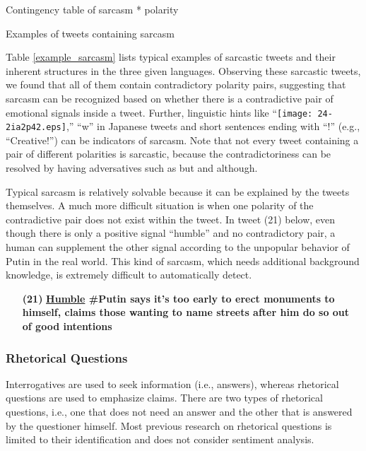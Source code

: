 \documentclass[english]{jnlp_1.4}
\begin{document}
\begin{table}[t]
\caption{Contingency table of sarcasm * polarity}
\label{contingency_sarcasm}

\end{table}
\begin{table}[t]
\caption{Examples of tweets containing sarcasm}
\label{example_sarcasm}

\end{table}

Table \ref{example_sarcasm} lists typical examples of sarcastic tweets and their inherent structures in the three given languages. Observing these sarcastic tweets, we found that all of them contain contradictory polarity pairs, suggesting that sarcasm can be recognized based on whether there is a contradictive pair of emotional signals inside a tweet. Further, linguistic hints like ``\texttt{[image: 24-2ia2p42.eps]},'' ``w'' in Japanese tweets and short sentences ending with ``!'' (e.g., ``Creative!'') can be indicators of sarcasm. Note that not every tweet containing a pair of different polarities is sarcastic, because the contradictoriness can be resolved by having adversatives such as but and although.

Typical sarcasm is relatively solvable because it can be explained by the tweets themselves. A much more difficult situation is when one polarity of the contradictive pair does not exist within the tweet. In tweet (21) below, even though there is only a positive signal ``humble'' and no contradictory pair, a human can supplement the other signal according to the unpopular behavior of Putin in the real world. This kind of sarcasm, which needs additional background knowledge, is extremely difficult to automatically detect.
\begin{enumerate}
\item[{\bf (21)}] {\bf \underline{Humble} \#Putin says it's too early to erect monuments to himself, claims those wanting to name streets after him do so out of good intentions}
\end{enumerate}


\subsubsection{Rhetorical Questions}

Interrogatives are used to seek information (i.e., answers), whereas rhetorical questions are used to emphasize claims. There are two types of rhetorical questions, i.e., one that does not need an answer and the other that is answered by the questioner himself. Most previous research on rhetorical questions is limited to their identification \cite{Bhattasali15} and does not consider sentiment analysis.
\end{document}
